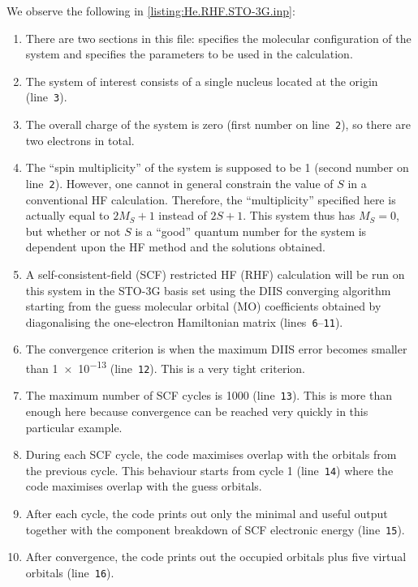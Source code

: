 			We observe the following in \cref{listing:He.RHF.STO-3G.inp}:
				\begin{enumerate}
					\item There are two sections in this file:  specifies the molecular configuration of the system and  specifies the parameters to be used in the calculation.
					\item The system of interest consists of a single  nucleus located at the origin (line~\texttt{3}).
					\item The overall charge of the system is zero (first number on line~\texttt{2}), so there are two electrons in total.
					\item The ``spin multiplicity'' of the system is supposed to be \SI{1}{} (second number on line~\texttt{2}).
					However, one cannot in general constrain the value of $S$ in a conventional HF calculation.
					Therefore, the ``multiplicity'' specified here is actually equal to $2M_S + 1$ instead of $2S + 1$.
					This system thus has $M_S = 0$, but whether or not $S$ is a ``good'' quantum number for the system is dependent upon the HF method and the solutions obtained.
					\item A self-consistent-field (SCF) restricted HF (RHF) calculation will be run on this system in the STO-3G basis set using the DIIS converging algorithm starting from the guess molecular orbital (MO) coefficients obtained by diagonalising the one-electron Hamiltonian matrix (lines~\texttt{6}--\texttt{11}).
					\item The convergence criterion is when the maximum DIIS error becomes smaller than \SI{1e-13}{} (line~\texttt{12}). This is a very tight criterion.
					\item The maximum number of SCF cycles is \SI{1000}{} (line~\texttt{13}). This is more than enough here because convergence can be reached very quickly in this particular example.
					\item During each SCF cycle, the code maximises overlap with the orbitals from the previous cycle. This behaviour starts from cycle 1 (line~\texttt{14}) where the code maximises overlap with the guess orbitals.
					\item After each cycle, the code prints out only the minimal and useful output together with the component breakdown of SCF electronic energy (line~\texttt{15}).
					\item After convergence, the code prints out the occupied orbitals plus five virtual orbitals (line~\texttt{16}).
				\end{enumerate}
		

